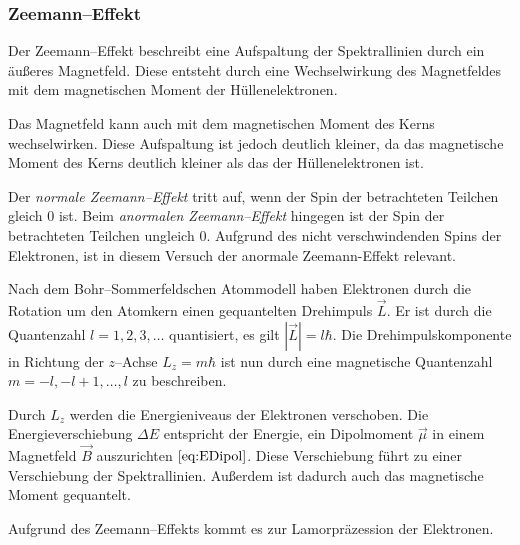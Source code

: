 \documentclass[12pt,a4paper]{scrartcl}
\numberwithin{equation}{section} %
\begin{document}
	\hypertarget{zeemanneffekt}{\subsubsection{Zeemann--Effekt}\label{zeemanneffekt}}
	
	Der Zeemann--Effekt beschreibt eine Aufspaltung der Spektrallinien durch ein äußeres Magnetfeld. Diese entsteht durch eine Wechselwirkung des Magnetfeldes mit dem magnetischen Moment der Hüllenelektronen.
	
	Das Magnetfeld kann auch mit dem magnetischen Moment des Kerns wechselwirken. Diese Aufspaltung ist jedoch deutlich kleiner, da das magnetische Moment des Kerns deutlich kleiner als das der Hüllenelektronen ist.
	
	Der \emph{normale Zeemann--Effekt} tritt auf, wenn der Spin der betrachteten Teilchen gleich $0$ ist. Beim \emph{anormalen Zeemann--Effekt} hingegen ist der Spin der betrachteten Teilchen ungleich $0$. Aufgrund des nicht verschwindenden Spins der Elektronen, ist in diesem Versuch der anormale Zeemann-Effekt relevant.
	
	Nach dem Bohr--Sommerfeldschen Atommodell haben Elektronen durch die Rotation um den Atomkern einen gequantelten Drehimpuls $\vec{L}$. Er ist durch die Quantenzahl $l=1,2,3,\dots$ quantisiert, es gilt $|\vec{L}| = l\hbar$. Die Drehimpulskomponente in Richtung der $z$--Achse $L_z=m\hbar$ ist nun durch eine magnetische Quantenzahl $m=-l,-l+1,\dots,l$ zu beschreiben.
	
	Durch $L_z$ werden die Energieniveaus der Elektronen verschoben. Die Energieverschiebung $\Delta E$ entspricht der Energie, ein Dipolmoment $\vec \mu$ in einem Magnetfeld $\vec B$ auszurichten $\eqref{eq:EDipol}$. Diese Verschiebung führt zu einer Verschiebung der Spektrallinien. Außerdem ist dadurch auch das magnetische Moment gequantelt.
	
	Aufgrund des Zeemann--Effekts kommt es zur Lamorpräzession der Elektronen.
	
\end{document}
